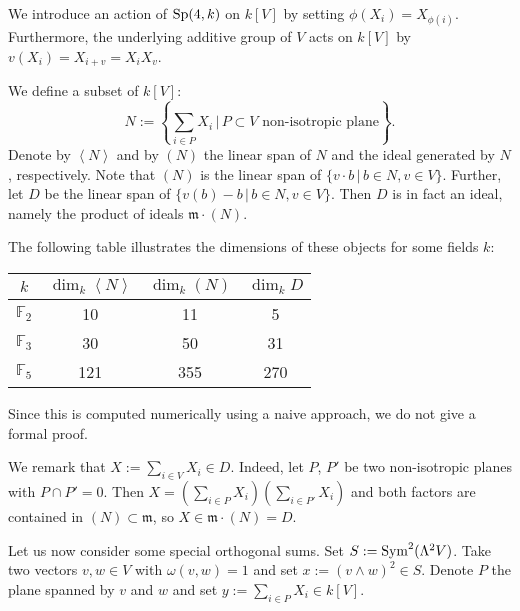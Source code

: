 We introduce an action of $\operatorname{Sp} (4,k)$ on $k[V]$ by setting $\phi(X_i) = X_{\phi(i)}$. Furthermore, the underlying additive group of $V$ acts on $k[V]$ by $v( X_i) = X_{i+v} =X_iX_v$. 
\begin{definition} \label{SymplecticIdeal}
We define a subset of $k[V]$:
$$
N  := \left\{\sum_{i\in P}X_i \,|\, P\subset V \text{ non-isotropic plane}\right\}.
$$
Denote by $\left< N \right>$ and by $(N)$ the linear span of $N$ and the ideal generated by $N$, respectively. Note that $(N) $ is the linear span of $ \{ v\cdot b \,|\, b\in N, v\in V \}$.
Further, let $D$ be the linear span of $\{v(b) - b \,|\, b\in N, v\in V \}$. Then $D$ is in fact an ideal, namely the product of ideals $\mathfrak m\cdot (N)$.
\end{definition}
\begin{proposition} \label{SymplecticIdealsDimension}
The following table illustrates the dimensions of these objects for some fields $k$:
\vspace{2mm}
\begin{center}
\begin{tabular}{c||c|c|c}
 $k$ & $\dim_k \left<N\right>$ & $\dim_k(N)$ & $\dim_k D$ \\
\hline
$\mathbb F_2$ & 10 & 11 &  5  \\
$\mathbb F_3$ & 30 & 50 & 31  \\
$\mathbb F_5$ &121 &355 &270
\end{tabular}
\end{center}
\end{proposition}
Since this is computed numerically using a naive approach, we do not give a formal proof.
\begin{rmk}\label{c2}
We remark that $X:=\sum_{i\in V}X_i\in D$. Indeed, let $P$, $P'$ be two non-isotropic planes with $P \cap P' = 0$. Then $X = \left( \sum_{i\in P}X_i\right)\left(  \sum_{i\in P'}X_i \right)$ and both factors are contained in $(N)\subset \mathfrak m$, so $X\in \mathfrak m \cdot (N) = D$.
\end{rmk}
Let us now consider some special orthogonal sums.
Set $S:=\operatorname{Sym}^2 (\Lambda^2V)$. Take two vectors $v,w\in V$ with $\omega(v,w)=1$ and set $x:= (v\wedge w)^2\in S$. Denote $P$ the plane spanned by $v$ and $w$ and set $y:= \sum_{i\in P}X_i\in  k[V]$.

